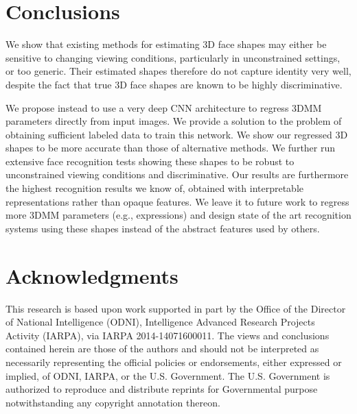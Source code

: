 \documentclass[10pt,twocolumn,letterpaper]{article}
\begin{document}
\section{Conclusions}
We show that existing methods for estimating 3D face shapes may either be sensitive to changing viewing conditions, particularly in unconstrained settings, or too generic. Their estimated shapes therefore do not capture identity very well, despite the fact that true 3D face shapes are known to be highly discriminative. 

We propose instead to use a very deep CNN architecture to regress 3DMM parameters directly from input images. We provide a solution to the problem of obtaining sufficient labeled data to train this network. We show our regressed 3D shapes to be more accurate than those of alternative methods. We further run extensive face recognition tests showing these shapes to be robust to unconstrained viewing conditions and discriminative. Our results are furthermore the highest recognition results we know of, obtained with interpretable representations rather than opaque features. We leave it to future work to regress more 3DMM parameters (e.g., expressions) and design state of the art recognition systems using these shapes instead of the abstract features used by others.
 
\section*{Acknowledgments}
This research is based upon work supported in part by the Office of the Director of National Intelligence (ODNI), Intelligence Advanced Research Projects Activity (IARPA), via IARPA 2014-14071600011. The views and conclusions contained herein are those of the authors and should not be interpreted as necessarily representing the official policies or endorsements, either expressed or implied, of ODNI, IARPA, or the U.S. Government.  The U.S. Government is authorized to reproduce and distribute reprints for Governmental purpose notwithstanding any copyright annotation thereon.
\end{document}
